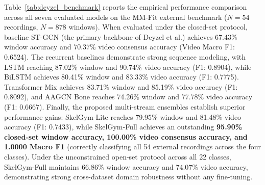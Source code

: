 \documentclass[runningheads]{llncs}
\begin{document}
Table~\ref{tab:deyzel_benchmark} reports the empirical performance comparison across all seven evaluated models on the MM-Fit external benchmark ($N=54$ recordings, $N=878$ windows). When evaluated under the closed-set protocol, baseline ST-GCN \cite{yan2018} (the primary backbone of Deyzel et al.) achieves 67.43\% window accuracy and 70.37\% video consensus accuracy (Video Macro F1: 0.6524). The recurrent baselines demonstrate strong sequence modeling, with LSTM reaching 87.02\% window and 90.74\% video accuracy (F1: 0.8904), while BiLSTM achieves 80.41\% window and 83.33\% video accuracy (F1: 0.7775). Transformer Mix achieves 83.71\% window and 85.19\% video accuracy (F1: 0.8092), and AAGCN Bone reaches 74.26\% window and 77.78\% video accuracy (F1: 0.6667). Finally, the proposed multi-stream ensembles establish superior performance gains: SkelGym-Lite reaches 79.95\% window and 81.48\% video accuracy (F1: 0.7433), while SkelGym-Full achieves an outstanding \textbf{95.90\% closed-set window accuracy, 100.00\% video consensus accuracy, and 1.0000 Macro F1} (correctly classifying all 54 external recordings across the four classes). Under the unconstrained open-set protocol across all 22 classes, SkelGym-Full maintains 66.86\% window accuracy and 74.07\% video accuracy, demonstrating strong cross-dataset domain robustness without any fine-tuning.
\end{document}
